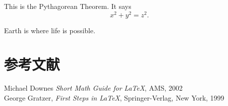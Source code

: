 \begin{theorem}
  This is the Pythagorean Theorem. It says
  \begin{equation}
    x^{2}+y^{2}=z^{2}.
  \end{equation}
\end{theorem}
\begin{definition}
Earth is where life is possible.
\end{definition}

\section{参考文献}
Michael Downes \emph{Short Math Guide for \LaTeX}, AMS, 2002\\[0.2in]
George Gratzer, \emph{First Steps in \LaTeX}, Springer-Verlag, New York, 1999\\[0.2in]


